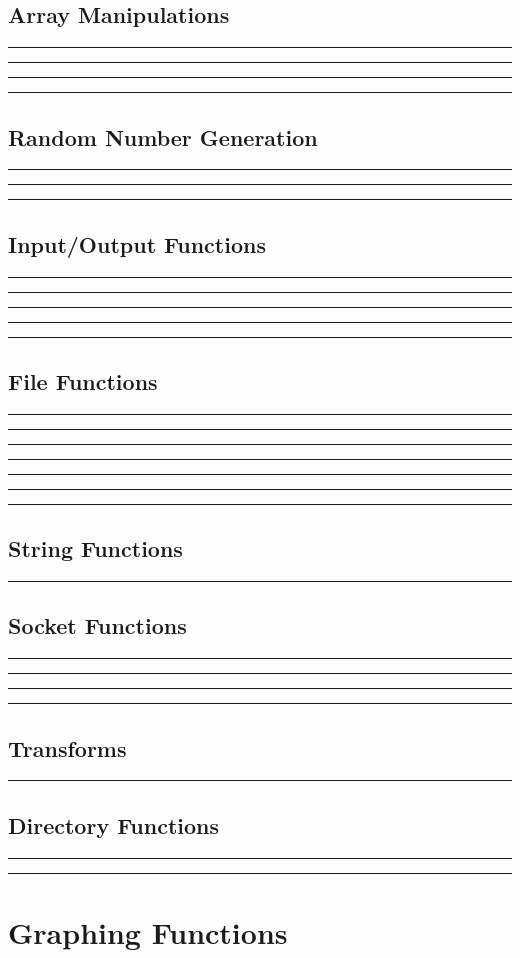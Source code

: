 \documentclass{book}
\begin{document}
\section{Array Manipulations}

\hrule

\hrule

\hrule

\hrule
%

\section{Random Number Generation}

\hrule

\hrule

\hrule


\section{Input/Output Functions}

\hrule

\hrule

\hrule

\hrule

\hrule
%

\section{File Functions}

\hrule

\hrule

\hrule

\hrule

\hrule

\hrule

\hrule


\section{String Functions}

\hrule


\section{Socket Functions}

\hrule

\hrule

\hrule

\hrule


\section{Transforms}

\hrule
%

\section{Directory Functions}

\hrule

\hrule


\chapter{Graphing Functions}
\end{document}
